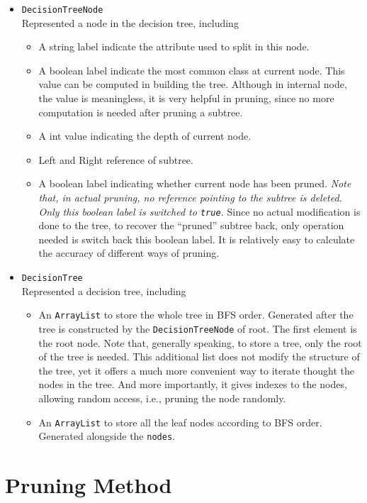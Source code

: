 \documentclass[12pt, letterpaper]{article}
\begin{document}
\begin{itemize}
    \item \texttt{DecisionTreeNode}\\
    Represented a node in the decision tree, including
    \begin{itemize}
        \item A string label indicate the attribute used to split in this node.
        \item A boolean label indicate the most common class at current node. This value can be computed in building the tree. Although in internal node, the value is meaningless, it is very helpful in pruning, since no more computation is needed after pruning a subtree.
        \item A int value indicating the depth of current node.
        \item Left and Right reference of subtree.
        \item A boolean label indicating whether current node has been pruned. 
        \emph{Note that, in actual pruning, no reference pointing to the subtree is deleted. Only this boolean label is switched to \texttt{true}.} Since no actual modification is done to the tree, to recover the ``pruned'' subtree back, only operation needed is switch back this boolean label. It is relatively easy to calculate the accuracy of different ways of pruning.
    \end{itemize} 

    \item \texttt{DecisionTree}\\
    Represented a decision tree, including
    \begin{itemize}
        \item An \texttt{ArrayList} to store the whole tree in BFS order. Generated after the tree is constructed by the \texttt{DecisionTreeNode} of root. The first element is the root node.
        Note that, generally speaking, to store a tree, only the root of the tree is needed. This additional list does not modify the structure of the tree, yet it offers a much more convenient way to iterate thought the nodes in the tree. And more importantly, it gives indexes to the nodes, allowing random access, i.e., pruning the node randomly.
        \item An \texttt{ArrayList} to store all the leaf nodes according to BFS order. Generated alongside the \texttt{nodes}.
    \end{itemize}
\end{itemize}

\section{Pruning Method}
\end{document}
